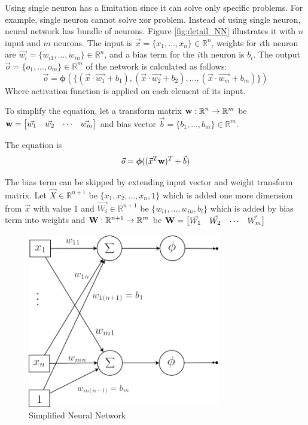 \documentclass[draft,dvipsnames]{drexel-thesis}
\begin{document}
\begin{thesis}
Using single neuron has a limitation since it can solve only specific problems. For example, single neuron cannot solve xor problem. Instead of using single neuron, neural network has bundle of neurons. Figure \ref{fig:detail_NN} illustrates it with $n$ input and $m$ neurons. The input is $\vec{x} = \{x_1, ..., x_n\} \in \mathbb{R}^n$, weights for $i$th neuron are $\vec{w_i} = \{w_{i1}, ..., w_{in}\} \in \mathbb{R}^n$, and a bias term for the $i$th neuron is $b_i$. The output $\vec{o} = \{o_1, ..., o_m\} \in \mathbb{R}^m$ of the network is calculated as follows:
$$\vec{o} = \bm{\phi}(\{(\vec{x}\cdot\vec{w_1}+b_1),(\vec{x}\cdot\vec{w_2}+b_2),...,(\vec{x}\cdot\vec{w_m}+b_m)\})$$
Where activation function is applied on each element of its input.

To simplify the equation, let a transform matrix $\bold{w}: \mathbb{R}^n \rightarrow \mathbb{R}^m$ be
$\bold{w}=
\begin{bmatrix}
	\vec{w_1} & \vec{w_2} & \cdots & \vec{w_m}
\end{bmatrix}$
and bias vector $\vec{b} = \{b_1, ..., b_m\} \in \mathbb{R}^m$.

The equation is
$$\vec{o} = \bm{\phi}((\vec{x}^T\bold{w})^T+\vec{b})$$

The bias term can be skipped by extending input vector and weight transform matrix. Let $\vec{X} \in \mathbb{R}^{n+1}$ be $\{x_1, x_2, ..., x_n, 1\}$ which is added one more dimension from $\vec{x}$ with value 1 and $\vec{W_i} \in \mathbb{R}^{n+1}$ be $\{w_{i1}, ..., w_{in}, b_i\}$ which is added by bias term into weights and $\bold{W}: \mathbb{R}^{n+1} \rightarrow \mathbb{R}^m$ be
$\bold{W}=
\begin{bmatrix}
	\vec{W_1} & \vec{W_2} & \cdots & \vec{W_m}
\end{bmatrix}$

\begin{figure}[t!]
    \centering
    \includegraphics[width=0.75\textwidth]{pictures/figures/detail_NN_with_bias.png}
    \caption{Simplified Neural Network}
    \label{fig:withoutBiasNN}
\end{figure}


\end{thesis}
\end{document}
